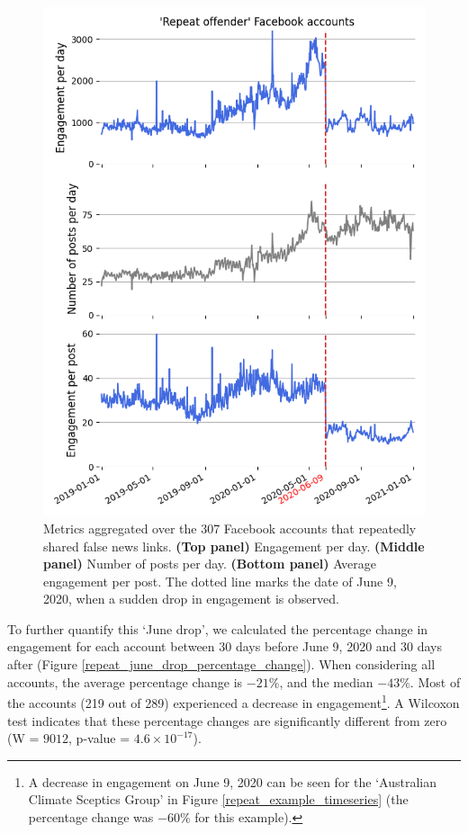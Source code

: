 \documentclass[11pt,a4paper]{article}
\begin{document}
\begin{figure}[!h]
\centering
\includegraphics[width=\linewidth]{./../figure/repeat_average_timeseries.png}
\caption{Metrics aggregated over the 307 Facebook accounts that repeatedly shared false news links. {\bf(Top panel)} Engagement per day. {\bf(Middle panel)} Number of posts per day. {\bf(Bottom panel)} Average engagement per post. The dotted line marks the date of June 9, 2020, when a sudden drop in engagement is observed.}
\label{repeat_average_timeseries}
\end{figure}

To further quantify this ‘June drop’, we calculated the percentage change in engagement for each account between 30 days before June 9, 2020 and 30 days after (Figure \ref{repeat_june_drop_percentage_change}). 
When considering all accounts, the average percentage change is $-21\%$, and the median $-43\%$. Most of the accounts (219 out of 289) experienced a decrease in engagement\footnote{A decrease in engagement on June 9, 2020 can be seen for the `Australian Climate Sceptics Group' in Figure \ref{repeat_example_timeseries} (the percentage change was $-60\%$ for this example).}.
A Wilcoxon test indicates that these percentage changes are significantly different from zero (W = $9012$, p-value = $4.6 \times 10^{-17}$).
\end{document}
